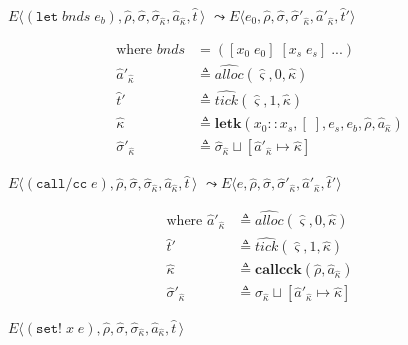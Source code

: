 \documentclass[12pt,draft]{article}
\newcommand{\callccsyn}[1]{(\texttt{call/cc}\;#1)}
\newcommand{\setsyn}[2]{(\texttt{set!}\;#1\;#2)}
\begin{document}
{\begin{multicols*}{2}
\begin{center}
\end{center}
\begin{center}
  $E\langle
  (\texttt{let}\;bnds\;e_b), \hat{\rho}  , \hat{\sigma} , \hat{\sigma}_{\hat{\kappa}} , \hat{a}_{\hat{\kappa}} , \hat{t}\,\rangle$
  $\leadsto E\langle e_0 , \hat{\rho}  , \hat{\sigma} , \hat{\sigma}'_{\hat{\kappa}} , \hat{a}'_{\hat{\kappa}} , \hat{t}'\rangle$
\end{center}
\vspace{-4mm}
\begin{align*}
  \text{where }
  bnds &= ([x_0\;e_0]\;[x_s\;e_s]\;...) \\
  \hat{a}'_{\hat{\kappa}} &\triangleq \widehat{alloc}(\hat{\varsigma}, 0, \hat{\kappa}) \\
  \hat{t}' &\triangleq \widehat{tick}(\hat{\varsigma}, 1, \hat{\kappa}) \\
  \hat{\kappa} &\triangleq \textbf{letk}(x_0::x_s, [\;], e_s, e_b, \hat{\rho}, \hat{a}_{\hat{\kappa}}) \\
  \hat{\sigma}'_{\hat{\kappa}} &\triangleq \hat{\sigma}_{\hat{\kappa}} \sqcup [\hat{a}'_{\hat{\kappa}} \mapsto \hat{\kappa}]
\end{align*}
\begin{center}
  $E\langle \callccsyn{e} , \hat{\rho} , \hat{\sigma} , \hat{\sigma}_{\hat{\kappa}} , \hat{a}_{\hat{\kappa}} , \hat{t}\,\rangle$
  $\leadsto E\langle e , \hat{\rho} , \hat{\sigma} , \hat{\sigma}'_{\hat{\kappa}} , \hat{a}'_{\hat{\kappa}} , \hat{t}'\rangle$
\end{center}
\vspace{-4mm}
\begin{align*}
  \text{where } \hat{a}'_{\hat{\kappa}} &\triangleq \widehat{alloc}(\hat{\varsigma}, 0, \hat{\kappa}) \\
  \hat{t}' &\triangleq \widehat{tick}(\hat{\varsigma}, 1, \hat{\kappa}) \\
  \hat{\kappa} &\triangleq \textbf{callcck}(\hat{\rho}, \hat{a}_{\hat{\kappa}}) \\
  \hat{\sigma}'_{\hat{\kappa}} &\triangleq \hat{\sigma}_{\hat{\kappa}} \sqcup [\hat{a}'_{\hat{\kappa}} \mapsto \hat{\kappa}]
\end{align*}
\begin{center}
  $E\langle \setsyn{x}{e} , \hat{\rho} , \hat{\sigma} , \hat{\sigma}_{\hat{\kappa}} , \hat{a}_{\hat{\kappa}} , \hat{t}\,\rangle$

\end{center}
\end{multicols*}}
\end{document}
